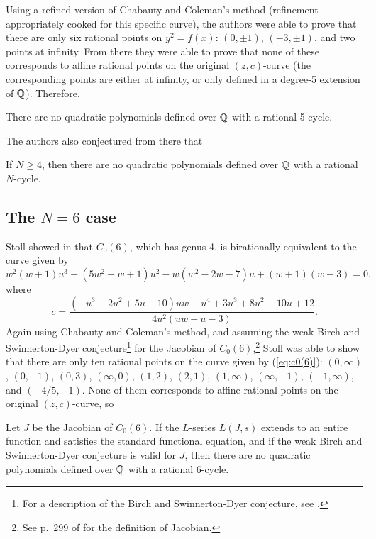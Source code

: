 Using a refined version of Chabauty and Coleman's method (refinement
appropriately cooked for this specific curve), the authors were able
to prove that there are only six rational points on $y^2 = f(x)$: $(0,
\pm 1)$, $(-3, \pm 1)$, and two points at infinity. From there they
were able to prove that none of these corresponds to affine rational
points on the original $(z, c)$-curve (the corresponding points are
either at infinity, or only defined in a degree-5 extension of $\mathbb{Q}$).
Therefore,

\begin{theorem}
  There are no quadratic polynomials defined over $\mathbb{Q}$ with a rational
  5-cycle.
\end{theorem}

The authors also conjectured from there that

\begin{conjecture}
  If $N \ge 4$, then there are no quadratic polynomials defined over
  $\mathbb{Q}$ with a rational $N$-cycle.
\end{conjecture}

\subsection{The $N = 6$ case}
\label{subsec:model-6}

Stoll showed in \cite{MR2465796} that $C_0(6)$, which has genus 4, is
birationally equivalent to the curve given by
\begin{equation}
  \label{eq:c0(6)}
  w^2(w+1)u^3 - (5w^2+w+1)u^2 - w(w^2-2w-7)u + (w+1)(w-3) = 0,
\end{equation}
where
\begin{equation}
  \label{eq:c-in-uw}
  c = \frac{(- u^3 - 2u^2 + 5u - 10)uw - u^4 + 3u^3 + 8u^2 - 10u +
    12}{4u^2(uw+u-3)}.
\end{equation}
Again using Chabauty and Coleman's method, and assuming the weak Birch
and Swinnerton-Dyer conjecture\footnote{%
  For a description of the Birch and Swinnerton-Dyer conjecture, see
  \cite{MR2238272}.}
for the Jacobian of $C_0(6)$,\footnote{%
  See p.~299 of \cite{MR1917232} for the definition of Jacobian.
}
Stoll was able to show that there are only ten rational points on the
curve given by (\ref{eq:c0(6)}): $(0, \infty)$, $(0, -1)$, $(0, 3)$,
$(\infty, 0)$, $(1, 2)$, $(2, 1)$, $(1, \infty)$, $(\infty, -1)$,
$(-1, \infty)$, and $(-4/5, -1)$. None of them corresponds to affine
rational points on the original $(z, c)$-curve, so

\begin{theorem}
  Let $J$ be the Jacobian of $C_0(6)$. If the $L$-series $L(J,s)$
  extends to an entire function and satisfies the standard functional
  equation, and if the weak Birch and Swinnerton-Dyer conjecture is
  valid for $J$, then there are no quadratic polynomials defined over
  $\mathbb{Q}$ with a rational 6-cycle.
\end{theorem}

